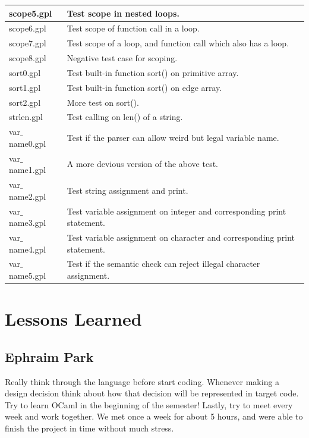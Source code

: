 \documentclass[a4paper,12pt]{article}
\begin{document}
\begin{center}
\begin{longtable}{ | p{3cm} | p{10cm} |}
    scope5.gpl & Test scope in nested loops.  \\ \hline
    scope6.gpl & Test scope of function call in a loop.  \\ \hline
    scope7.gpl & Test scope of a loop, and function call which also has a loop.  \\ \hline
    scope8.gpl & Negative test case for scoping.  \\ \hline
    sort0.gpl & Test built-in function sort() on primitive array.  \\ \hline
    sort1.gpl & Test built-in function sort() on edge array.  \\ \hline
    sort2.gpl & More test on sort().  \\ \hline
    strlen.gpl & Test calling on len() of a string.  \\ \hline
    var$\_$name0.gpl & Test if the parser can allow weird but legal variable name. \\ \hline
    var$\_$name1.gpl & A more devious version of the above test.  \\ \hline
    var$\_$name2.gpl & Test string assignment and print. \\ \hline
    var$\_$name3.gpl & Test variable assignment on integer and corresponding print statement. \\ \hline
    var$\_$name4.gpl & Test variable assignment on character and corresponding print statement. \\ \hline
    var$\_$name5.gpl & Test if the semantic check can reject illegal character assignment. \\ \hline
    \end{longtable}
\end{center}

\section{Lessons Learned}

\subsection{Ephraim Park}
Really think through the language before start coding. Whenever making a design decision think about how that decision will be represented in target code. Try to learn OCaml in the beginning of the semester! Lastly, try to meet every week and work together. We met once a week for about 5 hours, and were able to finish the project in time without much stress.
\end{document}
